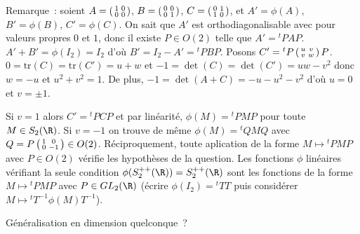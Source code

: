 {\begin{enumerate}
{    Remarque~: soient $A = \left(\begin{smallmatrix}1&0\cr0&0\cr\end{smallmatrix}\right)$,
                      $B = \left(\begin{smallmatrix}0&0\cr0&1\cr\end{smallmatrix}\right)$,
                      $C = \left(\begin{smallmatrix}0&1\cr1&0\cr\end{smallmatrix}\right)$,
    et $A'=\phi(A)$, $B'=\phi(B)$, $C'=\phi(C)$. On sait que $A'$ est
    orthodiagonalisable avec pour valeurs propres $0$ et $1$, donc il existe
    $P\in O(2)$ telle que $A' = {}^tPAP$. $A'+B'=\phi(I_2)=I_2$ d'où
    $B' = I_2-A' = {}^tPBP$. Posons $C' = {}^tP\left(\begin{smallmatrix}u&v\cr v&w\cr\end{smallmatrix}\right)P$.
    $0=\mathrm{tr}(C) = \mathrm{tr}(C') = u+w$ et $-1=\det(C) = \det(C') = uw-v^2$
    donc $w=-u$ et $u^2+v^2=1$. De plus,
    $-1=\det(A+C) = -u-u^2-v^2$ d'où $u=0$ et $v=\pm 1$.
    
    Si $v=1$ alors $C' = {}^tPCP$ et par linéarité, $\phi(M)={}^tPMP$
    pour toute $M\in S_2(\R)$.
    Si $v=-1$ on trouve de même $\phi(M) = {}^tQMQ$ avec $Q=P\left(\begin{smallmatrix}1&0\cr0&-1\cr\end{smallmatrix}\right)\in O(2)$.
    Réciproquement, toute aplication de la forme $M  \mapsto{}^tPMP$ avec $P\in O(2)$
    vérifie les hypothèses de la question. Les fonctions $\phi$
    linéaires vérifiant la seule condition $\phi(S_2^{++}(\R)) = S_2^{++}(\R)$
    sont les fonctions de la forme $M \mapsto{}^tPMP$ avec $P\in GL_2(\R)$
    (écrire $\phi(I_2) = {}^tTT$ puis considérer $M \mapsto{}^tT^{-1}\phi(M)T^{-1}$).
    
    Généralisation en dimension quelconque~?}
\end{enumerate}
}